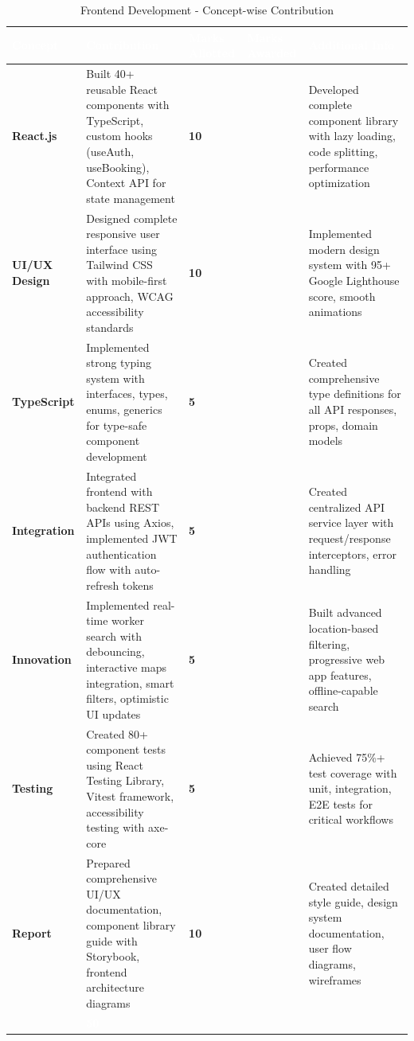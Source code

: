 \documentclass[12pt,a4paper]{article}
\begin{document}
\begin{table}[h!]
\centering
\renewcommand{\arraystretch}{1.4}
\begin{tabular}{|p{2.5cm}|p{4.5cm}|>{\centering\arraybackslash}p{2cm}|>{\centering\arraybackslash}p{2cm}|p{4cm}|}
\hline
\rowcolor{headerblue}
\textcolor{white}{\textbf{Concept}} & 
\textcolor{white}{\textbf{Contribution}} & 
\textcolor{white}{\textbf{Marks Allotted}} & 
\textcolor{white}{\textbf{Marks Awarded}} & 
\textcolor{white}{\textbf{Additional Info}} \\
\hline
\rowcolor{lightgray}
\textbf{React.js} & Built 40+ reusable React components with TypeScript, custom hooks (useAuth, useBooking), Context API for state management & \textbf{10} & & Developed complete component library with lazy loading, code splitting, performance optimization \\
\hline

\textbf{UI/UX Design} & Designed complete responsive user interface using Tailwind CSS with mobile-first approach, WCAG accessibility standards & \textbf{10} & & Implemented modern design system with 95+ Google Lighthouse score, smooth animations \\
\hline
\rowcolor{lightgray}
\textbf{TypeScript} & Implemented strong typing system with interfaces, types, enums, generics for type-safe component development & \textbf{5} & & Created comprehensive type definitions for all API responses, props, domain models \\
\hline

\textbf{Integration} & Integrated frontend with backend REST APIs using Axios, implemented JWT authentication flow with auto-refresh tokens & \textbf{5} & & Created centralized API service layer with request/response interceptors, error handling \\
\hline
\rowcolor{lightgray}
\textbf{Innovation} & Implemented real-time worker search with debouncing, interactive maps integration, smart filters, optimistic UI updates & \textbf{5} & & Built advanced location-based filtering, progressive web app features, offline-capable search \\
\hline

\textbf{Testing} & Created 80+ component tests using React Testing Library, Vitest framework, accessibility testing with axe-core & \textbf{5} & & Achieved 75\%+ test coverage with unit, integration, E2E tests for critical workflows \\
\hline
\rowcolor{lightgray}
\textbf{Report} & Prepared comprehensive UI/UX documentation, component library guide with Storybook, frontend architecture diagrams & \textbf{10} & & Created detailed style guide, design system documentation, user flow diagrams, wireframes \\
\hline
\hline
\rowcolor{headerblue}
\multicolumn{2}{|r|}{\textcolor{white}{\textbf{TOTAL}}} & \textcolor{white}{\textbf{50}} & & \\
\hline
\end{tabular}
\caption{Frontend Development - Concept-wise Contribution}
\renewcommand{\arraystretch}{1}
\end{table}
\end{document}
